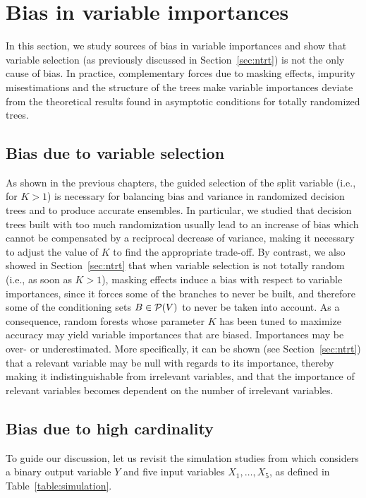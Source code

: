 \section{Bias in variable importances}
\label{sec:7:bias}

In this section, we study sources of bias in variable importances and show that
variable selection (as previously discussed in Section~\ref{sec:ntrt}) is  not
the only cause of bias. In practice, complementary forces due to masking
effects, impurity misestimations and the structure of the trees make variable
importances deviate from the theoretical results found in asymptotic conditions
for totally randomized trees.

\subsection{Bias due to variable selection}

As shown in the previous chapters, the guided selection of the split variable
(i.e., for $K>1$) is necessary for balancing bias and variance in  randomized
decision trees and to produce accurate ensembles. In particular, we studied
that decision trees built with too much randomization usually lead to an
increase of bias which cannot be compensated by a reciprocal decrease of
variance, making it necessary to adjust the value of $K$ to find the
appropriate trade-off. By contrast, we also showed in Section~\ref{sec:ntrt}
that when variable selection is not totally random (i.e., as soon as $K>1$),
masking effects induce a bias with respect to variable importances, since it
forces some of the branches to never be built, and therefore some of the
conditioning sets $B \in {\cal P}(V)$ to never be taken into account. As a
consequence, random forests whose parameter $K$ has been tuned to maximize
accuracy may yield variable importances that are biased. Importances may be
over- or underestimated. More specifically, it can be shown (see
Section~\ref{sec:ntrt}) that a relevant variable may be null with regards to
its importance, thereby making it indistinguishable from irrelevant variables,
and that the importance of relevant variables becomes dependent on the number
of irrelevant variables.

\subsection{Bias due to high cardinality}

To guide our discussion, let us revisit the simulation studies from
\citep{strobl:2007b} which considers a binary output variable $Y$ and five
input variables $X_1,\dots,X_5$, as defined in Table~\ref{table:simulation}.

